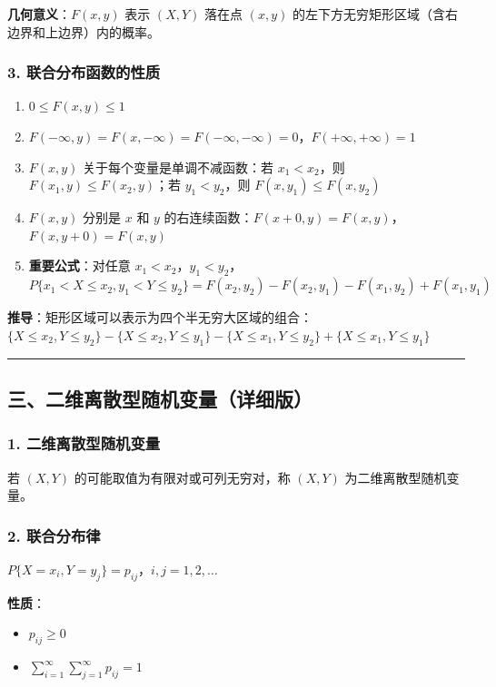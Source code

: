 \documentclass[12pt,a4paper]{ctexart}
\begin{document}
\textbf{几何意义}：$F(x, y)$ 表示 $(X, Y)$ 落在点 $(x, y)$ 的左下方无穷矩形区域（含右边界和上边界）内的概率。

\subsubsection{3. 联合分布函数的性质}
\begin{enumerate}[noitemsep]
    \item $0 \le F(x, y) \le 1$
    \item $F(-\infty, y) = F(x, -\infty) = F(-\infty, -\infty) = 0$，$F(+\infty, +\infty) = 1$
    \item $F(x, y)$ 关于每个变量是单调不减函数：若 $x_1 < x_2$，则 $F(x_1, y) \le F(x_2, y)$；若 $y_1 < y_2$，则 $F(x, y_1) \le F(x, y_2)$
    \item $F(x, y)$ 分别是 $x$ 和 $y$ 的右连续函数：$F(x+0, y) = F(x, y)$，$F(x, y+0) = F(x, y)$
    \item \textbf{重要公式}：对任意 $x_1 < x_2$，$y_1 < y_2$，\\
          $P\{x_1 < X \le x_2, y_1 < Y \le y_2\} = F(x_2, y_2) - F(x_2, y_1) - F(x_1, y_2) + F(x_1, y_1)$
\end{enumerate}

\textbf{推导}：矩形区域可以表示为四个半无穷大区域的组合：\\
$\{X \le x_2, Y \le y_2\} - \{X \le x_2, Y \le y_1\} - \{X \le x_1, Y \le y_2\} + \{X \le x_1, Y \le y_1\}$

\vspace{1em}\hrule\vspace{1em}

\subsection{三、二维离散型随机变量（详细版）}

\subsubsection{1. 二维离散型随机变量}
若 $(X, Y)$ 的可能取值为有限对或可列无穷对，称 $(X, Y)$ 为二维离散型随机变量。

\subsubsection{2. 联合分布律}
$P\{X = x_i, Y = y_j\} = p_{ij}$，$i, j = 1, 2, \dots$

\textbf{性质}：
\begin{itemize}[noitemsep]
    \item $p_{ij} \ge 0$
    \item $\sum_{i=1}^\infty \sum_{j=1}^\infty p_{ij} = 1$
\end{itemize}
\end{document}
